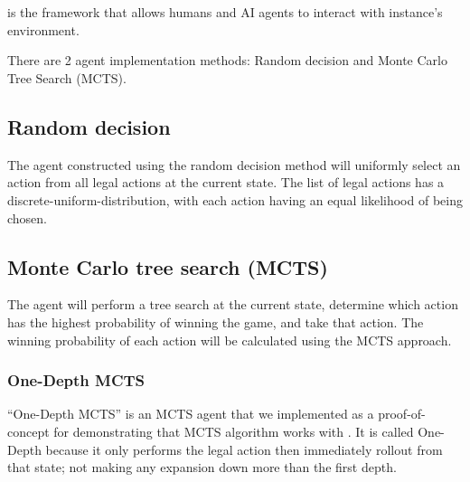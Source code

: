 \section{\RootAI}
\RootAI{} is the framework that allows humans and AI agents to interact with \RootOurs{} instance's environment.

There are 2 agent implementation methods: Random decision and Monte Carlo Tree Search (MCTS).

\subsection{Random decision}
The agent constructed using the random decision method will uniformly select an action from all legal actions at the current state. The list of legal actions has a \gls{discrete-uniform-distribution}, with each action having an equal likelihood of being chosen. %


\subsection{Monte Carlo tree search (MCTS)} %
The agent will perform a tree search at the current state, determine which action has the highest probability of winning the game, and take that action. The winning probability of each action will be calculated using the MCTS approach.


\subsubsection{One-Depth MCTS}
``One-Depth MCTS'' is an MCTS agent that we implemented as a proof-of-concept for demonstrating that MCTS algorithm works with \RootB{}. It is called One-Depth because it only performs the legal action then immediately rollout from that state; not making any expansion down more than the first depth.

